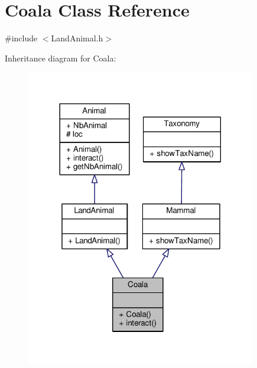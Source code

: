 \hypertarget{classCoala}{}\section{Coala Class Reference}
\label{classCoala}


{\ttfamily \#include $<$Land\+Animal.\+h$>$}



Inheritance diagram for Coala\+:
\nopagebreak
\begin{figure}[H]
\begin{center}
\leavevmode
\includegraphics[width=284pt]{classCoala__inherit__graph}
\end{center}
\end{figure}


